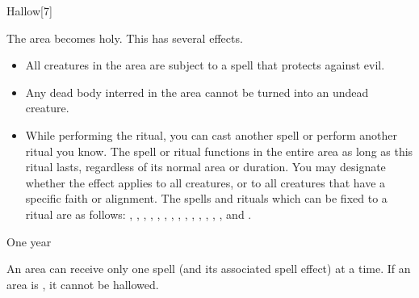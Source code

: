 \begin{spellsection}{Hallow}[7]
    \begin{spellheader}
    \end{spellheader}
    \begin{spellcontent}
        \begin{spelltargetinginfo}
        \end{spelltargetinginfo}
        \begin{spelleffects}
            \spelleffect The area becomes holy. This has several effects.
            \begin{itemize}
                \item All creatures in the area are subject to a  spell that protects against evil.
                \item Any dead body interred in the area cannot be turned into an undead creature.
                \item While performing the ritual, you can cast another spell or perform another ritual you know. The spell or ritual functions in the entire area as long as this ritual lasts, regardless of its normal area or duration. You may designate whether the effect applies to all creatures, or to all creatures that have a specific faith or alignment. The spells and rituals which can be fixed to a  ritual are as follows: , , , , , , , , , , , , , , and .
            \end{itemize}
            \spelldur One year
        \end{spelleffects}
    \end{spellcontent}
    \begin{spellfooter}
        \spellnotes An area can receive only one  spell (and its associated spell effect) at a time. If an area is , it cannot be hallowed.
    \end{spellfooter}
\end{spellsection}

